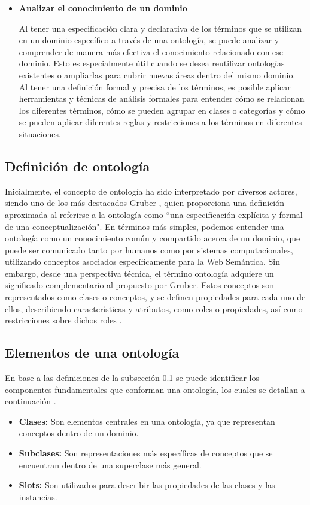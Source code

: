 \documentclass[10pt, a4paper,openany]{book}
\theoremstyle{definition}
\begin{document}
\begin{itemize}
    \item \textbf{Analizar el conocimiento de un dominio}
    
    Al tener una especificación clara y declarativa de los términos que se utilizan en un dominio específico a través de una ontología, se puede analizar y comprender de manera más efectiva el conocimiento relacionado con ese dominio.
    Esto es especialmente útil cuando se desea reutilizar ontologías existentes o ampliarlas para cubrir nuevas áreas dentro del mismo dominio.
    Al tener una definición formal y precisa de los términos, es posible aplicar herramientas y técnicas de análisis formales para entender cómo se relacionan los diferentes términos, cómo se pueden agrupar en clases o categorías y cómo se pueden aplicar diferentes reglas y restricciones a los términos en diferentes situaciones.

     
\end{itemize}
\subsection{Definición de ontología}
\label{SS: Definición de ontología}
Inicialmente, el concepto de ontología ha sido interpretado por diversos actores, siendo uno de los más destacados Gruber \cite{gruber_toward_1995}, quien proporciona una definición aproximada al referirse a la ontología como ``una especificación explícita y formal de una conceptualización".
En términos más simples, podemos entender una ontología como un conocimiento común y compartido acerca de un dominio, que puede ser comunicado tanto por humanos como por sistemas computacionales, utilizando conceptos asociados específicamente para la Web Semántica.
Sin embargo, desde una perspectiva técnica, el término ontología adquiere un significado complementario al propuesto por Gruber.
Estos conceptos son representados como clases o conceptos, y se definen propiedades para cada uno de ellos, describiendo características y atributos, como roles o propiedades, así como restricciones sobre dichos roles \cite{filho_ontology_nodate}.
\subsection{Elementos de una ontología}
\label{SS: Elementos de una ontología}
En base a las definiciones de la subsección \ref{SS: Definición de ontología}  se puede identificar los componentes fundamentales que conforman una ontología, los cuales se detallan a continuación \cite{filho_ontology_nodate}.
\begin{itemize}
    \item \textbf{Clases: }Son elementos centrales en una ontología, ya que representan conceptos dentro de un dominio.
    \item \textbf{Subclases: }Son representaciones más específicas de conceptos que se encuentran dentro de una superclase más general.
    \item \textbf{Slots: }Son utilizados para describir las propiedades de las clases y las instancias.
\end{itemize}
\end{document}
